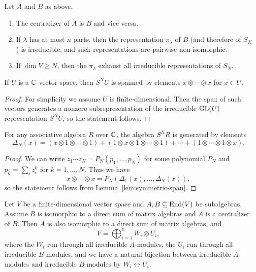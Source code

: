 \begin{theorem}\label{thm:schur-weyl}
  Let $A$ and $B$ as above.
  \begin{enumerate}
    \item The centralizer of $A$ is
      $B$ and vice versa.
    \item If $\lambda$ has at most
      $n$ parts, then the representation
      $\pi_\lambda$ of $B$ (and therefore
      of $S_N$) is irreducible, and
      such representations are pairwise
      non-isomorphic.
    \item If $\dim V \ge N$, then
      the $\pi_\lambda$ exhaust
      all irreducible representations of
      $S_N$.
  \end{enumerate}
\end{theorem}

\begin{lemma}\label{lem:symmetric-span}
  If $U$ is a $\mathbb{C}$-vector space, then
  $S^N U$ is spanned by elements
  $x \otimes \cdots \otimes x$
  for $x \in U$.
\end{lemma}

\begin{proof}
  For simplicity we assume $U$ is
  finite-dimensional. Then the
  span of such vectors generates a
  nonzero subrepresentation of the
  irreducible $\operatorname{GL}(U)$
  representation $S^N U$, so the
  statement follows.
\end{proof}

\begin{lemma}
  For any associative algebra
  $R$ over $\mathbb{C}$, the algebra
  $S^N R$ is generated by elements
  \[
    \Delta_N(x) =
    (x \otimes 1 \otimes \cdots \otimes 1)
    + (1 \otimes x \otimes 1 \otimes \cdots \otimes 1)
    + \cdots
    + (1 \otimes \cdots \otimes 1 \otimes x).
  \]
\end{lemma}

\begin{proof}
  We can write
  $z_1 \cdots z_N = P_N(p_1, \dots, p_N)$
  for some polynomial $P_N$ and
  $p_k = \sum_i z_i^k$ for $k = 1, \dots, N$.
  Thus we have
  \[
    x \otimes \cdots \otimes x
    = P_N(\Delta_1(x), \dots, \Delta_N(x)),
  \]
  so the statement follows from
  Lemma~\ref{lem:symmetric-span}.
\end{proof}

\begin{lemma}\label{lem:double-centralizer}
  Let $V$ be a finite-dimensional
  vector space and $A, B \subseteq \operatorname{End}(V)$ 
  be subalgebras. Assume $B$ is
  isomorphic to a direct sum of matrix
  algebras and
  $A$ is a centralizer of $B$.
  Then $A$ is also isomorphic to a direct
  sum of matrix algebras, and
  \[
    V = \bigoplus_{i = 1}^n W_i \otimes U_i,
  \]
  where the $W_i$ run through all irreducible
  $A$-modules, the $U_i$ run through
  all irreducible $B$-modules, and
  we have a natural bijection
  between irreducible $A$-modules
  and irreducible $B$-modules
  by $W_i \leftrightarrow U_i$.
\end{lemma}

